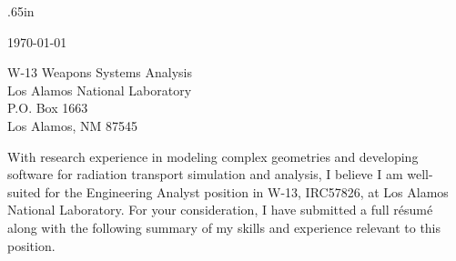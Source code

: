 \documentclass[a4paper,10pt]{article}
\begin{document}
\pagestyle{empty} 		%
\sloppy 			%


\vspace{5mm}


  \normalsize
  
  \begingroup
  \leftskip.65in
  \rightskip\leftskip

  \vspace{4mm} 
  \today \\
  \vspace{2mm}

W-13 Weapons Systems Analysis\\
Los Alamos National Laboratory \\
P.O. Box 1663 \\
Los Alamos, NM 87545
  
  \vspace{4mm} 

With research experience in modeling complex geometries and developing
software for radiation transport simulation and analysis, I believe I am
well-suited for the Engineering Analyst position in W-13, IRC57826,
at Los Alamos National Laboratory.
For your consideration, I have submitted a full r\'{e}sum\'{e} along with
the following summary of my skills and
experience relevant to this position.


\end{document}
